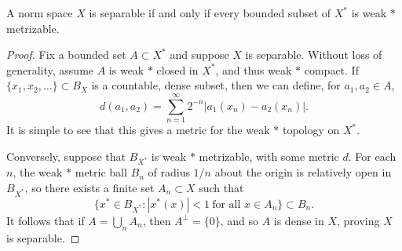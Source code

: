 \begin{comment}
\begin{theorem}[Banach-Alaoglu]
    Let $X$ be a norm space. Then every bounded subset of $X^*$ is weak $*$ compact.
\end{theorem}
\begin{proof}
    It suffices to prove that $B_X$ is weak $*$ compact. Recall Tychonoff's theorem, which says that an arbitrary product of compact topological spaces is compact. If
    \[ B = \{ \alpha : |\alpha| \leq 1 \} \]
    is the unit ball of scalars, then $B$ is compact, and so
    \[ A = \prod_{x \in B_X} B \]
    is compact. The map $f: B_{X^*} \to A$ given by
    \[ f(x^*) = \prod_{x \in B_X} x^*(x) \]
    is an embedding where $B_{X^*}$ has the weak $*$ topology. It thus suffices to show that $f(B_X^*)$ is closed in $A$. But if there exists a function $f: B_X \to B$ and a net $\{ x_\alpha^* \}$ in $B_{X^*}$ such that $x_\alpha^*(x) \to f(x)$ for each $x \in B_X$, then it is simple to see that $f$ extends to a linear function $f: X \to B$, $x_\alpha^*(x) \to x$ for all $x \in X$, and
    \[ |f(x)| = |\lim_{\alpha} x_\alpha^*(x)| \leq \limsup_{\alpha \to \infty} \| x_\alpha^* \| \| x \| \leq \| x \|. \]
    Thus $f \in B_{X^*}$, completing the proof.
\end{proof}
\end{comment}

\begin{corollary}
    A norm space $X$ is separable if and only if every bounded subset of $X^*$ is weak $*$ metrizable.
\end{corollary}
\begin{proof}
    Fix a bounded set $A \subset X^*$ and suppose $X$ is separable. Without loss of generality, assume $A$ is weak $*$ closed in $X^*$, and thus weak $*$ compact. If $\{ x_1, x_2, \dots \} \subset B_X$ is a countable, dense subset, then we can define, for $a_1,a_2 \in A$,
    \[ d(a_1, a_2) = \sum_{n = 1}^\infty 2^{-n} |a_1(x_n) - a_2(x_n)|. \]
    It is simple to see that this gives a metric for the weak $*$ topology on $X^*$.

    Conversely, suppose that $B_{X^*}$ is weak $*$ metrizable, with some metric $d$. For each $n$, the weak $*$ metric ball $B_n$ of radius $1/n$ about the origin is relatively open in $B_{X^*}$, so there exists a finite set $A_n \subset X$ such that
    \[ \{ x^* \in B_{X^*}: |x^*(x)| < 1\ \text{for all $x \in A_n$} \} \subset B_n. \]
    It follows that if $A = \bigcup_n A_n$, then $A^\perp = \{ 0 \}$, and so $A$ is dense in $X$, proving $X$ is separable.
\end{proof}


